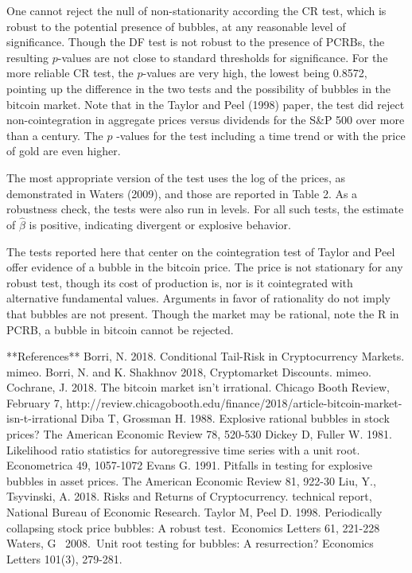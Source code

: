 \documentclass{article}
\begin{document}
One cannot reject the null of non-stationarity according the CR test, which
is robust to the potential presence of bubbles, at any reasonable level of
significance. Though the DF test is not robust to the presence of PCRBs,
the resulting $p$-values are not close to standard thresholds for
significance. For the more reliable CR test, the $p$-values are very high,
the lowest being 0.8572, pointing up the difference in the two tests and the
possibility of bubbles in the bitcoin market. Note that in the Taylor
and Peel (1998) paper, the test did reject non-cointegration in aggregate
prices versus dividends for the S\&P 500 over more than a century. The $p$%
-values for the test including a time trend or with the price of gold are
even higher.

The most appropriate version of the test uses the log of the prices, as
demonstrated in Waters (2009), and those are reported in Table 2. As a
robustness check, the tests were also run in levels. For all such tests,
the estimate of $\widehat{\beta }$ is positive, indicating divergent or
explosive behavior.

The tests reported here that center on the cointegration test of Taylor and
Peel offer evidence of a bubble in the bitcoin price. The price is not
stationary for any robust test, though its cost of production is, nor is it
cointegrated with alternative fundamental values. Arguments in favor of
rationality do not imply that bubbles are not present. Though the market
may be rational, note the R in PCRB, a bubble in bitcoin cannot be rejected.

\bigskip

**References**
Borri, N. 2018. Conditional Tail-Risk in Cryptocurrency Markets.
mimeo.\bigskip \newline
Borri, N. and K. Shakhnov 2018, Cryptomarket Discounts. mimeo.\bigskip
\newline
Cochrane, J. 2018. The bitcoin market isn't irrational. Chicago Booth
Review, February 7,\newline
http://review.chicagobooth.edu/finance/2018/article-bitcoin-market-isn-t-irrational\bigskip
\newline
Diba T, Grossman H. 1988. Explosive rational bubbles in stock prices? The
American Economic Review 78, 520-530\bigskip \newline
Dickey D, Fuller W. 1981. Likelihood ratio statistics for autoregressive
time series with a unit root. Econometrica 49, 1057-1072\bigskip \newline
Evans G. 1991. Pitfalls in testing for explosive bubbles in asset prices.
The American Economic Review 81, 922-30\bigskip \newline
Liu, Y., Tsyvinski, A. 2018. Risks and Returns of Cryptocurrency. technical
report, National Bureau of Economic Research.\bigskip \newline
Taylor M, Peel D. 1998. Periodically collapsing stock price bubbles: A
robust test.\ Economics Letters 61, 221-228\bigskip \newline
Waters, G \ 2008.\ Unit root testing for bubbles: A resurrection?
Economics Letters 101(3), 279-281.
\end{document}
